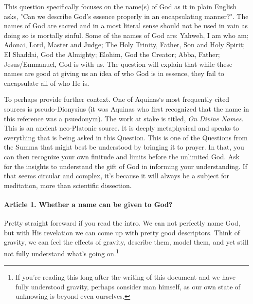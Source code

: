 \documentclass{ucetd}
\begin{document}
This question specifically focuses on the name(s) of God as it in plain English asks, "Can we describe God's essence properly in an encapsulating manner?". The names of God are sacred and in a most literal sense should not be used in vain as doing so is mortally sinful. Some of the names of God are: Yahweh, I am who am; Adonai, Lord, Master and Judge; The Holy Trinity, Father, Son and Holy Spirit; El Shaddai, God the Almighty; Elohim, God the Creator; Abba, Father; Jesus/Emmanuel, God is with us. The question will explain that while these names are good at giving us an idea of who God is in essence, they fail to encapsulate all of who He is.

To perhaps provide further context. One of Aquinas`s most frequently cited sources is pseudo-Dionysius (it was Aquinas who first recognized that the name in this reference was a psuedonym). The work at stake is titled, \textit{On Divine Names.} This is an ancient neo-Platonic source. It is deeply metaphysical and speaks to everything that is being asked in this Question. This is one of the Questions from the Summa that might best be understood by bringing it to prayer. In that, you can then recognize your own finitude and limits before the unlimited God. Ask for the insights to understand the gift of God in informing your understanding. If that seems circular and complex, it's because it will always be a subject for meditation, more than scientific dissection.

\paragraph{Article 1. Whether a name can be given to God?}
Pretty straight foreward if you read the intro. We can not perfectly name God, but with His revelation we can come up with pretty good descriptors. Think of gravity, we can feel the effects of gravity, describe them, model them, and yet still not fully understand what's going on.\footnote{If you're reading this long after the writing of this document and we have fully understood gravity, perhaps consider man himself, as our own state of unknowing is beyond even ourselves.}
\end{document}

